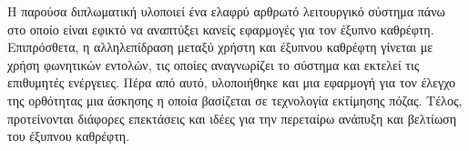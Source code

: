 Η παρούσα διπλωματική υλοποιεί ένα ελαφρύ αρθρωτό λειτουργικό σύστημα πάνω στο οποίο είναι εφικτό να αναπτύξει κανείς εφαρμογές για τον έξυπνο καθρέφτη. Επιπρόσθετα, η αλληλεπίδραση μεταξύ χρήστη και έξυπνου καθρέφτη γίνεται με χρήση φωνητικών εντολών, τις οποίες αναγνωρίζει το σύστημα και εκτελεί τις επιθυμητές ενέργειες. Πέρα από αυτό, υλοποιήθηκε και μια εφαρμογή για τον έλεγχο της ορθότητας μια άσκησης η οποία βασίζεται σε τεχνολογία εκτίμησης πόζας. Τέλος, προτείνονται διάφορες επεκτάσεις και ιδέες για την περεταίρω ανάπυξη και βελτίωση του έξυπνου καθρέφτη.
